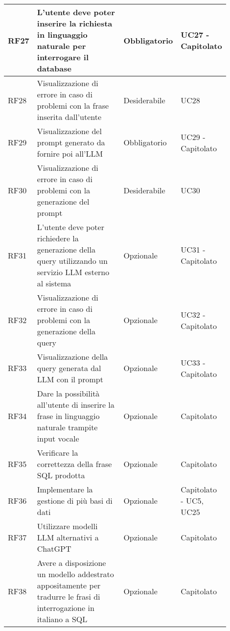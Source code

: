 \begin{center}
\begin{tabular}{ |p{0.10\linewidth}|p{0.50\linewidth}|p{0.15\linewidth}|p{0.15\linewidth}| }
		\hline
		RF27 & L'utente deve poter inserire la richiesta in linguaggio naturale per interrogare il database & Obbligatorio & UC27 - Capitolato \\
		\hline
		RF28 & Visualizzazione di errore in caso di problemi con la frase inserita dall'utente & Desiderabile & UC28 \\
		\hline
		RF29 & Visualizzazione del prompt generato da fornire poi all'LLM & Obbligatorio & UC29 - Capitolato \\
		\hline
		RF30 & Visualizzazione di errore in caso di problemi con la generazione del prompt & Desiderabile & UC30 \\
		\hline
		RF31 & L'utente deve poter richiedere la generazione della query utilizzando un servizio LLM esterno al sistema & Opzionale & UC31 - Capitolato \\
		\hline
		RF32 & Visualizzazione di errore in caso di problemi con la generazione della query & Opzionale & UC32 - Capitolato \\
		\hline
		RF33 & Visualizzazione della query generata dal LLM con il prompt & Opzionale & UC33 - Capitolato \\
		\hline
		RF34 & Dare la possibilità all'utente di inserire la frase in linguaggio naturale trampite input vocale & Opzionale & Capitolato \\
		\hline
		RF35 & Verificare la correttezza della frase SQL prodotta & Opzionale & Capitolato \\
		\hline
		RF36 & Implementare la gestione di più basi di dati & Opzionale & Capitolato - UC5, UC25 \\
		\hline
		RF37 & Utilizzare modelli LLM alternativi a ChatGPT & Opzionale & Capitolato \\
		\hline
		RF38 & Avere a disposizione un modello addestrato appositamente per tradurre le frasi di interrogazione in italiano a SQL & Opzionale & Capitolato \\
		\hline
	\end{tabular}
\end{center}

